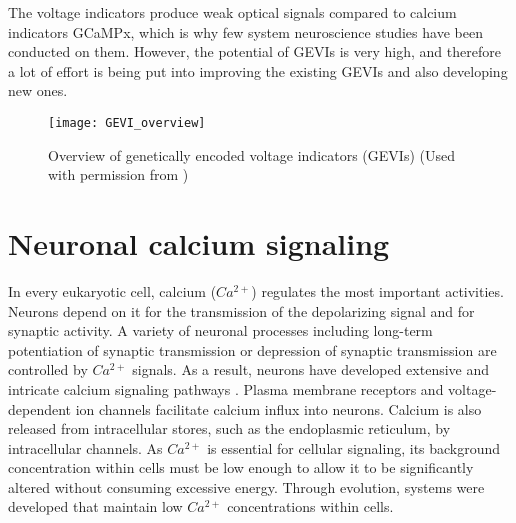 The voltage indicators produce weak optical signals compared to calcium indicators GCaMPx, which is why few system neuroscience studies have been conducted on them. However, the potential of GEVIs is very high, and therefore a lot of effort is being put into improving the existing GEVIs and also developing new ones.

\begin{figure}
\centering
\hspace*{-1cm} 
\texttt{[image: GEVI\_overview]}
\caption[Overview of genetically encoded voltage indicators (GEVIs)] {Overview of genetically encoded voltage indicators (GEVIs) (Used with permission from \parencite{Knopfel2019})} 
\label{fig:voltageindicators}
\end{figure}

\section{Neuronal calcium signaling}
In every eukaryotic cell, calcium ($Ca^{2+}$) regulates the most important activities. Neurons depend on it for the transmission of the depolarizing signal and for synaptic activity. A variety of neuronal processes including long-term potentiation of synaptic transmission or depression of synaptic transmission are controlled by $Ca^{2+}$ signals. As a result, neurons have developed extensive and intricate calcium signaling pathways \parencite{Brini2014}. Plasma membrane receptors and voltage-dependent ion channels facilitate calcium influx into neurons. Calcium is also released from intracellular stores, such as the endoplasmic reticulum, by intracellular channels. As $Ca^{2+}$ is essential for cellular signaling, its background concentration within cells must be low enough to allow it to be significantly altered without consuming excessive energy. Through evolution, systems were developed that maintain low $Ca^{2+}$ concentrations within cells. 

